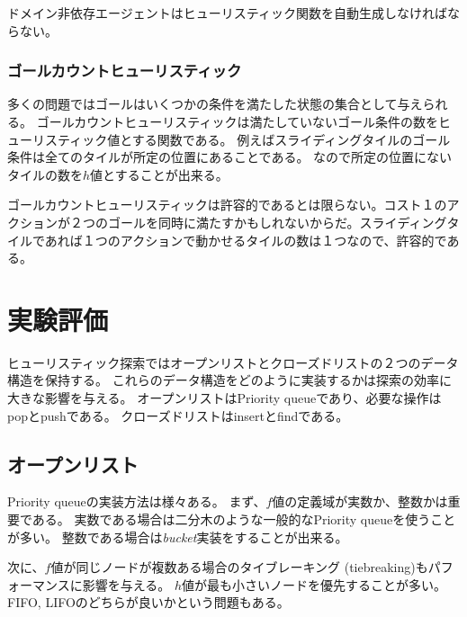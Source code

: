 \documentclass[b5paper]{report}
\begin{document}
ドメイン非依存エージェントはヒューリスティック関数を自動生成しなければならない。

\subsection{ゴールカウントヒューリスティック}

多くの問題ではゴールはいくつかの条件を満たした状態の集合として与えられる。
ゴールカウントヒューリスティックは満たしていないゴール条件の数をヒューリスティック値とする関数である。
例えばスライディングタイルのゴール条件は全てのタイルが所定の位置にあることである。
なので所定の位置にないタイルの数を$h$値とすることが出来る。

ゴールカウントヒューリスティックは許容的であるとは限らない。コスト１のアクションが２つのゴールを同時に満たすかもしれないからだ。スライディングタイルであれば１つのアクションで動かせるタイルの数は１つなので、許容的である。



\chapter{実験評価}
\label{ch:search-performance}
ヒューリスティック探索ではオープンリストとクローズドリストの２つのデータ構造を保持する。
これらのデータ構造をどのように実装するかは探索の効率に大きな影響を与える。
オープンリストはPriority queueであり、必要な操作はpopとpushである。
クローズドリストはinsertとfindである。

\section{オープンリスト}
\label{sec:open-list}
Priority queueの実装方法は様々ある。
まず、$f$値の定義域が実数か、整数かは重要である。
実数である場合は二分木のような一般的なPriority queueを使うことが多い。
整数である場合は{\it bucket}実装をすることが出来る。

次に、$f$値が同じノードが複数ある場合のタイブレーキング (tiebreaking)もパフォーマンスに影響を与える。
$h$値が最も小さいノードを優先することが多い。
FIFO, LIFOのどちらが良いかという問題もある。

\end{document}
